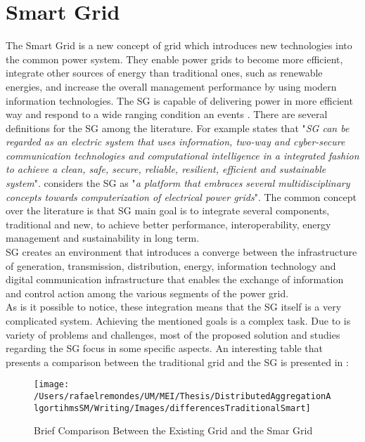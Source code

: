 \chapter{Smart Grid}\label{chap:sg}
The Smart Grid  is a new concept of grid which introduces new technologies into the common power system. They enable power grids to become more efficient, integrate other sources of energy than traditional ones, such as renewable energies, and increase the overall management performance by using modern information technologies. The SG is capable of delivering power in more efficient way and respond to a wide ranging condition an events \cite{journals/comsur/FangMXY12}. 
There are several definitions for the SG among the literature. For example \cite{journals/comsur/FangMXY12} states that  "\textit{SG can be regarded as an electric system that uses information, two-way and cyber-secure communication technologies and computational intelligence in a integrated fashion to achieve a clean, safe, secure, reliable, resilient, efficient and sustainable system}".\cite{conf/isgt/GhoshPR13} considers the SG as "\textit{a platform that embraces several multidisciplinary concepts towards computerization of electrical power grids}". The common concept over the literature is that SG main goal is to integrate several components, traditional and new, to achieve better performance, interoperability, energy management and sustainability in long term. \\
SG creates an environment that introduces a converge between the infrastructure of generation, transmission, distribution, energy, information technology and digital communication infrastructure that enables the exchange of information and control action among the various segments of the power grid.\\
As is it possible to notice, these integration means that the SG itself is a very complicated system. Achieving the mentioned goals is a complex task. Due to is variety of problems and challenges, most of the proposed solution and studies regarding the SG focus in some specific aspects. 
An interesting table that presents a comparison between the traditional grid and the SG is presented in \cite{journals/comsur/FangMXY12}:
\begin{figure}[h]
\centering
\texttt{[image: /Users/rafaelremondes/UM/MEI/Thesis/DistributedAggregationAlgortihmsSM/Writing/Images/differencesTraditionalSmart]}
\caption{\label{fig:comparisonOldNew} Brief Comparison Between the Existing Grid and the Smar Grid}
\end{figure}

